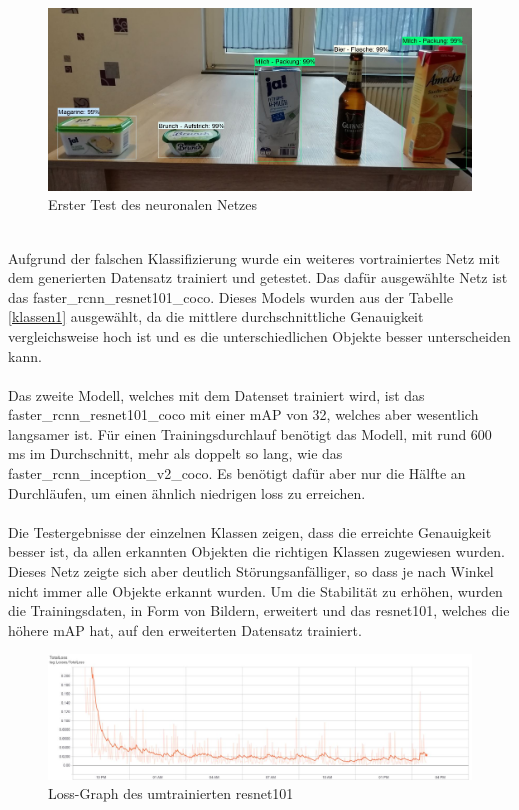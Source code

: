 \documentclass[a4paper,12pt,oneside]{article}
\begin{document}
\begin{figure}
    [h]
	\centering
	\includegraphics[scale=0.3]{Sources/Erster_Test.jpg}
	\caption{Erster Test des neuronalen Netzes}
	\label{img:TestNN}
\end{figure}\\
Aufgrund der falschen Klassifizierung wurde ein weiteres vortrainiertes Netz mit dem generierten Datensatz trainiert und getestet. Das dafür ausgewählte Netz ist das faster\_rcnn\_resnet101\_coco. Dieses Models wurden aus der Tabelle \ref{klassen1} ausgewählt, da die mittlere durchschnittliche Genauigkeit vergleichsweise hoch ist und es die unterschiedlichen Objekte besser unterscheiden kann.
\\
\\
Das zweite Modell, welches mit dem Datenset trainiert wird, ist das\\ faster\_rcnn\_resnet101\_coco mit einer mAP von 32, welches aber wesentlich langsamer ist. Für einen Trainingsdurchlauf benötigt das Modell, mit rund 600 ms im Durchschnitt, mehr als doppelt so lang, wie das faster\_rcnn\_inception\_v2\_coco. Es benötigt dafür aber nur die Hälfte an Durchläufen, um einen ähnlich niedrigen \glqq loss\grqq{} zu erreichen.\\
\\
Die Testergebnisse der einzelnen Klassen zeigen, dass die erreichte Genauigkeit besser ist, da allen erkannten Objekten die richtigen Klassen zugewiesen wurden. Dieses Netz zeigte sich aber deutlich Störungsanfälliger, so dass je nach Winkel nicht immer alle Objekte erkannt wurden. Um die Stabilität zu erhöhen, wurden die Trainingsdaten, in Form von Bildern, erweitert und das resnet101, welches die höhere \glqq mAP\grqq{} hat, auf den erweiterten Datensatz trainiert.
\\
\begin{figure}
    [h]
	\centering
	\includegraphics[scale=0.4]{Sources/loss_graph_resnet101.jpg}
	\caption{Loss-Graph des umtrainierten resnet101}
	\label{img:loss_graph_resnet101}
\end{figure}
\end{document}
